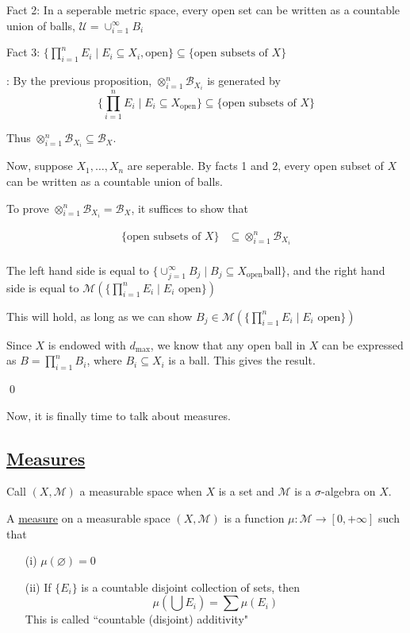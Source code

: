 \documentclass[x11names,reqno,14pt]{extarticle}
\begin{document}
Fact 2: In a seperable metric space, every open set can be written as a countable union of balls, $\mathcal{U} = \cup_{i=1}^\infty B_i$

Fact 3: $\{\prod_{i=1}^nE_i \mid E_i \subseteq X_i, \text{open}\} \subseteq \{\text{open subsets of }X\}$

\proof: By the previous proposition, $\otimes_{i=1}^n\mathcal{B}_{X_i}$ is generated by 
\[
\{\prod_{i=1}^nE_i \mid E_i \subseteq X_{\text{open}}\} \subseteq\{\text{open subsets of }X\}
\]

Thus $\otimes_{i=1}^n\mathcal{B}_{X_i} \subseteq \mathcal{B}_X$.

Now, suppose $X_1, \dots, X_n$ are seperable. By facts 1 and 2, every open subset of $X$ can be written as a countable union of balls. 

To prove $\otimes_{i=1}^n\mathcal{B}_{X_i} = \mathcal{B}_X$, it suffices to show that 

\begin{align*}
\{\text{open subsets of }X\} & \subseteq \otimes_{i=1}^n\mathcal{B}_{X_i}\\
\end{align*}

The left hand side is equal to $\{\cup_{j=1}^\infty B_j \mid B_j \subseteq X_{\text{open}}\text{ball}\}$, and the right hand side is equal to $\mathcal{M}\left(\{\prod_{i=1}^nE_i \mid E_i \text{ open} \}\right)$

This will hold, as long as we can show $B_j \in \mathcal{M}\left(\{\prod_{i=1}^nE_i\mid E_i\text{ open}\}\right)$

Since $X$ is endowed with $d_{\max}$, we know that any open ball in $X$ can be expressed as $B = \prod_{i=1}^nB_i$, where $B_i \subseteq X_i$ is a ball. This gives the result. 

\qed

Now, it is finally time to talk about measures. 

\subsection*{\underline{Measures}}

Call $(X, \mathcal{M})$ a measurable space when $X$ is a set and $\mathcal{M}$ is a $\sigma$-algebra on $X$. 

 A \underline{measure} on a measurable space $(X, \mathcal{M})$ is a function $\mu:\mathcal{M}\to[0, +\infty]$ such that

\begin{enumerate}
\item[(i)] $\mu(\varnothing) = 0$
\item[(ii)] If $\{E_i\}$ is a countable disjoint collection of sets, then
\[
\mu(\bigcup E_i) = \sum \mu(E_i)
\]
This is called ``countable (disjoint) additivity"
\end{enumerate}
\end{document}

